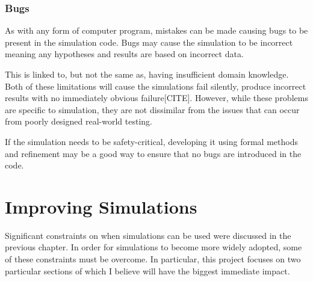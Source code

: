 \documentclass{UoYCSproject}
\begin{document}

\subsubsection{Bugs}
As with any form of computer program, mistakes can be made causing bugs to be present in the simulation code. Bugs may cause the simulation to be incorrect meaning any hypotheses and results are based on incorrect data.

This is linked to, but not the same as, having insufficient domain knowledge. Both of these limitations will cause the simulations fail silently, produce incorrect results with no immediately obvious failure[CITE].
However, while these problems are specific to simulation, they are not dissimilar from the issues that can occur from poorly designed real-world testing.

If the simulation needs to be safety-critical, developing it using formal methods and refinement may be a good way to ensure that no bugs are introduced in the code.

\section{Improving Simulations}
\label{improvements}
Significant constraints on when simulations can be used were discussed in the previous chapter. In order for simulations to become more widely adopted, some of these constraints must be overcome. 
In particular, this project focuses on two particular sections of which I believe will have the biggest immediate impact.
\end{document}
